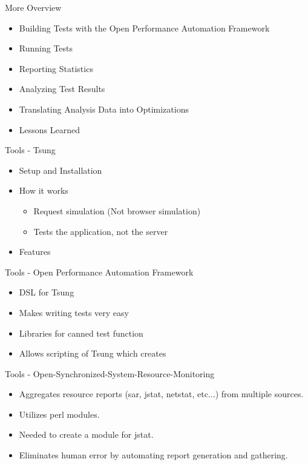\documentclass[xcolor=dvipsnames,14pt]{beamer}
\begin{document}
\begin{frame}{More Overview}
  \begin{itemize}
    \item Building Tests with the Open Performance Automation Framework
    \item Running Tests
    \item Reporting Statistics
    \item Analyzing Test Results
    \item Translating Analysis Data into Optimizations
    \item Lessons Learned
  \end{itemize}
\end{frame}

\begin{frame}{Tools - Tsung}
  \begin{itemize}
    \item Setup and Installation
    \item How it works
      \begin{itemize}
        \item Request simulation (Not browser simulation)
        \item Tests the application, not the server
      \end{itemize}
    \item Features
  \end{itemize}
\end{frame}

\begin{frame}{Tools - Open Performance Automation Framework}
  \begin{itemize}
    \item DSL for Tsung
    \item Makes writing tests very easy
    \item Libraries for canned test function
    \item Allows scripting of Tsung which creates
  \end{itemize}
\end{frame}

\begin{frame}{Tools - Open-Synchronized-System-Resource-Monitoring}
  \begin{itemize}
    \item Aggregates resource reports (sar, jstat, netstat, etc...) from multiple sources.
    \item Utilizes perl modules.
    \item Needed to create a module for jstat.
    \item Eliminates human error by automating report generation and gathering.
  \end{itemize}
\end{frame}
\end{document}
